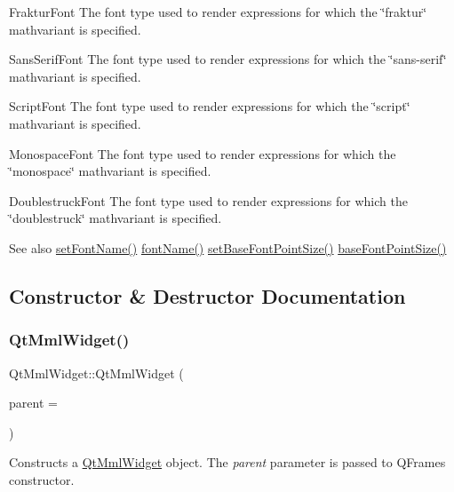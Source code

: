 Fraktur\+Font The font type used to render expressions for which the \char`\"{}fraktur\char`\"{} mathvariant is specified.

Sans\+Serif\+Font The font type used to render expressions for which the \char`\"{}sans-\/serif\char`\"{} mathvariant is specified.

Script\+Font The font type used to render expressions for which the \char`\"{}script\char`\"{} mathvariant is specified.

Monospace\+Font The font type used to render expressions for which the \char`\"{}monospace\char`\"{} mathvariant is specified.

Doublestruck\+Font The font type used to render expressions for which the \char`\"{}doublestruck\char`\"{} mathvariant is specified.

\begin{DoxySeeAlso}{See also}
\mbox{\hyperlink{class_qt_mml_widget_afbc5b98c9d39c328270a9d65d58b0b7a}{set\+Font\+Name()}} \mbox{\hyperlink{class_qt_mml_widget_ab8a069c5d6a449e3d9d67e6b818172d9}{font\+Name()}} \mbox{\hyperlink{class_qt_mml_widget_ab13b093180da6bc6e9f928f4a02321a8}{set\+Base\+Font\+Point\+Size()}} \mbox{\hyperlink{class_qt_mml_widget_ab255d9d35bca5f04d5828fabed87d5af}{base\+Font\+Point\+Size()}} 
\end{DoxySeeAlso}


\subsection{Constructor \& Destructor Documentation}
\mbox{\label{class_qt_mml_widget_a05b1ec7dcada67400486439a0650fca6}} 
\subsubsection{\texorpdfstring{Qt\+Mml\+Widget()}{QtMmlWidget()}}
{\footnotesize\ttfamily Qt\+Mml\+Widget\+::\+Qt\+Mml\+Widget (\begin{DoxyParamCaption}\item[{Q\+Widget $\ast$}]{parent = {} }\end{DoxyParamCaption})}

Constructs a \mbox{\hyperlink{class_qt_mml_widget}{Qt\+Mml\+Widget}} object. The {\itshape parent} parameter is passed to Q\+Frame\textquotesingle{}s constructor. \mbox{\label{class_qt_mml_widget_a9b3e3f0caac040257873da12b8e80603}} 
